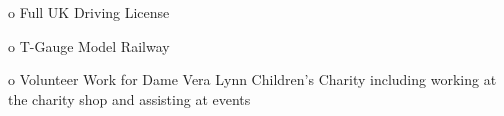 \documentclass[9pt]{developercv} %
\begin{document}
\begin{entrylist}

\entry
		{}
		{}
		{}
		{o Full UK Driving License}
		
	\end{entrylist}

\begin{minipage}[t]{0.5\textwidth}
	\vspace{-\baselineskip} %

\end{minipage}
\hfill
\begin{minipage}[t]{0.5\textwidth}
	\vspace{-\baselineskip} %
	
	\newline o T-Gauge Model Railway
\end{minipage}
\hfill
\begin{minipage}[t]{0.3\textwidth}
	\vspace{-\baselineskip} %
	
	\newline o Volunteer Work for Dame Vera Lynn Children's Charity including working at the charity shop and assisting at events
\end{minipage}

\end{document}

